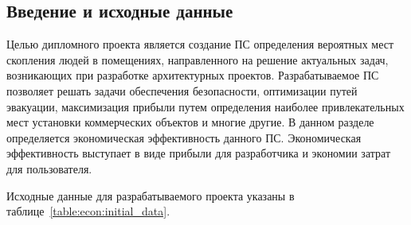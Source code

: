 






\FPround{}


\subsection{Введение и исходные данные}

Целью дипломного проекта является создание ПС определения вероятных мест скопления людей в помещениях,
направленного на решение актуальных задач, возникающих при разработке архитектурных проектов.
Разрабатываемое ПС позволяет решать задачи обеспечения безопасности, оптимизации путей эвакуации,
максимизация прибыли путем определения наиболее привлекательных мест установки коммерческих объектов и многие другие.
В данном разделе определяется экономическая эффективность данного ПС.
Экономическая эффективность выступает в виде прибыли для разработчика и экономии затрат для пользователя.

Исходные данные для разрабатываемого проекта указаны в таблице~\ref{table:econ:initial_data}.

